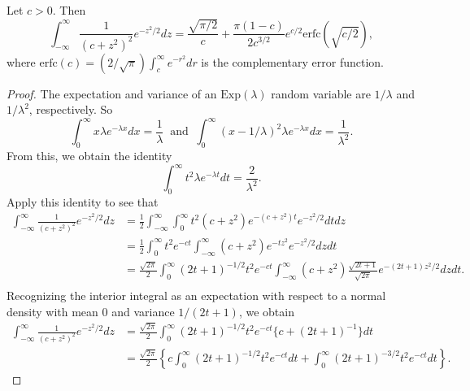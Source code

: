 \documentclass[10pt,a4paper]{amsart}
\begin{document}
\begin{lemma}\label{lem:intid1}
Let $c > 0$. Then
\begin{equation*}
    \int_{-\infty}^\infty \frac{1}{(c + z^2)^{2}}e^{-z^2/2} dz = \frac{\sqrt{\pi/2}}{c} + \frac{\pi(1-c)}{2c^{3/2}}e^{c/2}\mathrm{erfc}(\sqrt{c/2}),
\end{equation*}
where $\mathrm{erfc}(c) = (2/\sqrt{\pi})\int_{c}^\infty e^{-r^2} dr$ is the complementary error function.
\end{lemma}

\begin{proof}
The expectation and variance of an $\mathrm{Exp}(\lambda)$ random variable are $1/\lambda$ and $1/\lambda^2$, respectively. So
\begin{equation*}
    \int_{0}^\infty x \lambda e^{-\lambda x} dx = \frac{1}{\lambda}~\text{ and }~\int_{0}^\infty (x-1/\lambda)^2 \lambda e^{-\lambda x} dx = \frac{1}{\lambda^2}.
\end{equation*}
From this, we obtain the identity
\begin{equation*}
    \int_{0}^\infty t^2 \lambda e^{-\lambda t} dt = \frac{2}{\lambda^2} .
\end{equation*}
Apply this identity to see that 
\begin{equation*}
    \begin{aligned}
        \int_{-\infty}^\infty \frac{1}{(c + z^2)^{2}}e^{-z^2/2} dz &= \frac{1}{2} \int_{-\infty}^\infty \int_0^\infty t^2 (c+z^2)e^{-(c+z^2)t} e^{-z^2/2} dt dz \\ 
        &= \frac{1}{2} \int_0^\infty t^2 e^{-ct} \int_{-\infty}^\infty (c+z^2)e^{-t z^2} e^{-z^2/2} dz dt \\
        &= \frac{\sqrt{2\pi}}{2} \int_0^\infty (2t+1)^{-1/2}t^2 e^{-ct} \int_{-\infty}^\infty (c+z^2)\frac{\sqrt{2t+1}}{\sqrt{2\pi}} e^{-(2t+1)z^2/2} dz dt .\\
    \end{aligned}
\end{equation*}
Recognizing the interior integral as an expectation with respect to a normal density with mean $0$ and variance $1/(2t+1)$, we obtain
\begin{equation*}
    \begin{aligned}
        \int_{-\infty}^\infty \frac{1}{(c + z^2)^{2}}e^{-z^2/2} dz &= \frac{\sqrt{2\pi}}{2} \int_0^\infty (2t+1)^{-1/2}t^2 e^{-ct} \{c + (2t+1)^{-1}\} dt \\
        &= \frac{\sqrt{2\pi}}{2} \left\{ c\int_0^\infty (2t+1)^{-1/2}t^2 e^{-ct} dt + \int_0^\infty (2t+1)^{-3/2}t^2 e^{-ct} dt\right\}.

\end{aligned}
\end{equation*}
\end{proof}
\end{document}
